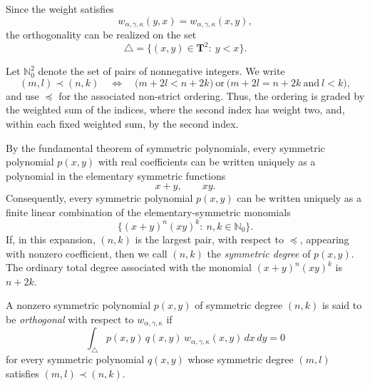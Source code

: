\documentclass[reqno,10pt]{amsart}
\theoremstyle{plain}
\numberwithin{equation}{section}
\numberwithin{figure}{section}
\begin{document}
Since the weight satisfies
\[
w_{\alpha,\gamma,\kappa}(y,x)=w_{\alpha,\gamma,\kappa}(x,y),
\]
the orthogonality can be realized on the set
\[
\triangle=\{(x,y)\in \mathbf{T}^2:\ y<x\}.
\]

Let $\mathbb{N}_0^2$ denote the set of pairs of nonnegative integers. We write
\[
(m,l)\prec(n,k)
\quad\Longleftrightarrow\quad
\bigl(m+2l<n+2k\bigr)\ \text{or}\ 
\bigl(m+2l=n+2k\ \text{and}\ l<k\bigr),
\]
and use $\preceq$ for the associated non-strict ordering. Thus, the
ordering is graded by the weighted sum of the indices, where the second
index has weight two, and, within each fixed weighted sum, by the second
index.

By the fundamental theorem of symmetric polynomials, every symmetric
polynomial $p(x,y)$ with real coefficients can be written uniquely as a
polynomial in the elementary symmetric functions
\[
x+y,\qquad xy.
\]
Consequently, every symmetric polynomial $p(x,y)$ can be written uniquely
as a finite linear combination of the elementary-symmetric monomials
\[
\{(x+y)^n(xy)^k:\ n,k\in\mathbb{N}_0\}.
\]
If, in this expansion, $(n,k)$ is the largest pair, with respect to
$\preceq$, appearing with nonzero coefficient, then we call $(n,k)$ the
\emph{symmetric degree} of $p(x,y)$. The ordinary total degree associated
with the monomial $(x+y)^n(xy)^k$ is $n+2k$.

A nonzero symmetric polynomial $p(x,y)$ of symmetric degree $(n,k)$ is said to be \emph{orthogonal} with respect to $w_{\alpha,\gamma,\kappa}$ if
\[
\int_{\triangle}
p(x,y)\,q(x,y)\,w_{\alpha,\gamma,\kappa}(x,y)\,dx\,dy=0
\]
for every symmetric polynomial $q(x,y)$ whose symmetric degree $(m,l)$ satisfies $(m,l)\prec(n,k)$. 
\end{document}
